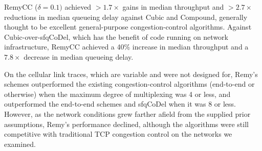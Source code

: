RemyCC ($\delta = 0.1)$ achieved $> 1.7\times$ gains in median
throughput and $> 2.7\times$ reductions in median queueing delay
against Cubic and Compound, generally thought to be excellent
general-purpose congestion-control algorithms. Against
Cubic-over-sfqCoDel, which has the benefit of code running on network
infrastructure, RemyCC achieved a 40\% increase in median throughput
and a $7.8\times$ decrease in median queueing delay.

On the cellular link traces, which are variable and were not designed
for, Remy's schemes outperformed the existing congestion-control
algorithms (end-to-end or otherwise) when the maximum degree of
multiplexing was 4 or less, and outperformed the end-to-end schemes
and sfqCoDel when it was 8 or less. However, as the network conditions
grew farther afield from the supplied prior assumptions, Remy's
performance declined, although the algorithms were still competitive
with traditional TCP congestion control on the networks we examined.

